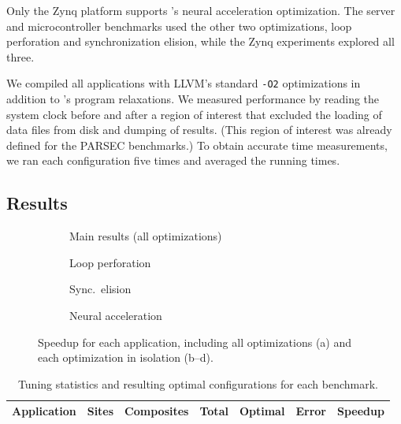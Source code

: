 Only the Zynq platform supports \sysname's neural acceleration optimization.
The server and microcontroller benchmarks used the other two optimizations,
loop perforation and synchronization elision, while the Zynq experiments
explored all three.

We compiled all applications with LLVM's standard \texttt{-O2} optimizations
in addition to \sysname's program relaxations.
%
We measured performance by reading the system clock before and after a
region of interest that excluded the
loading of data files from disk and dumping of results. (This region of
interest was already defined for the PARSEC benchmarks.)
To obtain accurate time measurements, we ran each configuration five times and
averaged the running times.


\subsection{Results}
\label{accept:sec:results}

\begin{figure}[t]
\begin{subfigure}[b]{2.35in}
\vspace{1.5ex}
\caption{Main results (all optimizations)}
\label{accept:fig:speedup-all}
\end{subfigure}
\begin{subfigure}[b]{2.05in}
\vspace{1.5ex}
\caption{Loop perforation}
\label{accept:fig:speedup-loopperf}
\end{subfigure}
\begin{subfigure}[b]{1.15in}
\vspace{1.5ex}
\caption{Sync.~elision}
\label{accept:fig:speedup-desync}
\end{subfigure}
\begin{subfigure}[b]{1.3in}
\vspace{1.5ex}
\caption{Neural acceleration}
\label{accept:fig:speedup-npu}
\end{subfigure}
\caption{Speedup for each application, including all
optimizations (a) and each optimization in isolation (b--d).}
\label{accept:fig:performance}
\end{figure}

\begin{table}
\centering
\begin{tabular}{l r r r r r r}
\toprule
Application & Sites & Composites & Total & Optimal & Error & Speedup \\
\midrule

\bottomrule
\end{tabular}
\caption{Tuning statistics and resulting optimal configurations for each benchmark.}
\label{accept:table:stats}
\end{table}

